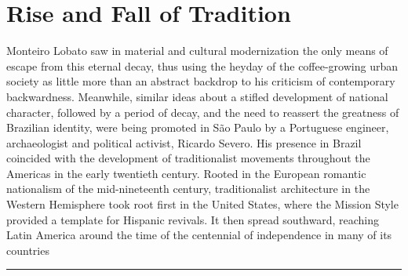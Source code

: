 \hypertarget{rise-and-fall-of-tradition}{%
\section{Rise and Fall of Tradition}\label{rise-and-fall-of-tradition}}

Monteiro Lobato saw in material and cultural modernization the only
means of escape from this eternal decay, thus using the heyday of the
coffee-growing urban society as little more than an abstract backdrop to
his criticism of contemporary backwardness. Meanwhile, similar ideas
about a stifled development of national character, followed by a period
of decay, and the need to reassert the greatness of Brazilian identity,
were being promoted in São Paulo by a Portuguese engineer, archaeologist
and political activist, Ricardo Severo. His presence in Brazil coincided
with the development of traditionalist movements throughout the Americas
in the early twentieth century. Rooted in the European romantic
nationalism of the mid-nineteenth century, traditionalist architecture
in the Western Hemisphere took root first in the United States, where
the Mission Style provided a template for Hispanic revivals. It then
spread southward, reaching Latin America around the time of the
centennial of independence in many of its countries
\autocite[p.~12]{amaral:1994invencion}

\begin{center}\rule{0.5\linewidth}{0.5pt}\end{center}
